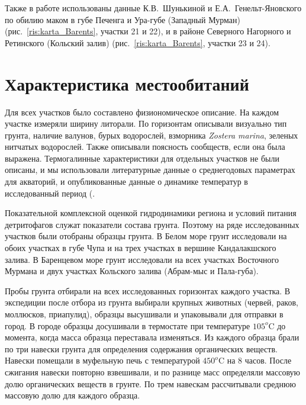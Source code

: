 Также в работе использованы данные К.\:В.~Шунькиной и Е.\:А.~Генельт-Яновского по обилию маком в губе Печенга и Ура-губе (Западный Мурман) (рис.~\ref{ris:karta_Barents}, участки 21 и 22), и в районе Северного Нагорного и Ретинского (Кольский залив) (рис.~\ref{ris:karta_Barents}, участки 23 и 24).

\afterpage{\clearpage}

    \section{Характеристика местообитаний}
Для всех участков было составлено физиономическое описание.
На каждом участке измеряли ширину литорали.
По горизонтам описывали визуально тип грунта, наличие валунов, бурых водорослей, взморника \textit{Zostera marina}, зеленых нитчатых водорослей. 
Также описывали поясность сообществ, если она была выражена.
Термогалинные характеристики для отдельных участков не были описаны, и мы использовали литературные данные о среднегодовых параметрах для акваторий, и опубликованные данные о динамике температур в исследованный период (\cite{KGZ_letopis, rp5_Kandalaksha, pinro}.

Показательной комплексной оценкой гидродинамики региона и условий питания детритофагов служат показатели состава грунта. 
Поэтому на ряде исследованных участков были отобраны образцы грунта. 
В Белом море грунт исследовали на обоих участках в губе Чупа и на трех участках в вершине Кандалакшского залива.
В Баренцевом море грунт исследовали на всех участках Восточного Мурмана и двух участках Кольского залива (Абрам-мыс и Пала-губа).

Пробы грунта отбирали на всех исследованных горизонтах каждого участка.
В экспедиции после отбора из грунта выбирали крупных животных (червей, раков, моллюсков, приапулид), образцы высушивали и упаковывали для отправки в город. 
В городе образцы досушивали в термостате при температуре $105^o$C до момента, когда масса образца переставала изменяться. 
Из каждого образца брали по три навески грунта для определения содержания органических веществ. 
Навески помещали в муфельную печь с температурой $450^o$C на $8$ часов. 
После сжигания навески повторно взвешивали, и по разнице масс определяли массовую долю органических веществ в грунте. 
По трем навескам рассчитывали среднюю массовую долю для каждого образца.

